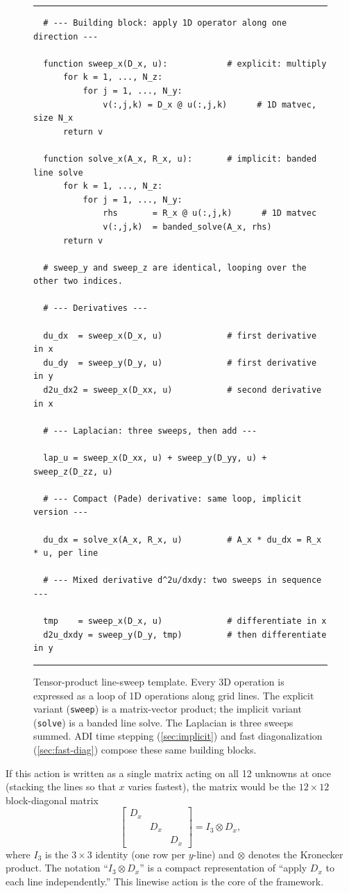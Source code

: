 \documentclass[11pt]{article}
\newcommand{\kron}{\otimes}
\newcommand{\Dx}{D_{x}}
\begin{document}
\begin{figure}[t]
\hrule\medskip
\small
\begin{verbatim}
  # --- Building block: apply 1D operator along one direction ---

  function sweep_x(D_x, u):            # explicit: multiply
      for k = 1, ..., N_z:
          for j = 1, ..., N_y:
              v(:,j,k) = D_x @ u(:,j,k)      # 1D matvec, size N_x
      return v

  function solve_x(A_x, R_x, u):       # implicit: banded line solve
      for k = 1, ..., N_z:
          for j = 1, ..., N_y:
              rhs       = R_x @ u(:,j,k)      # 1D matvec
              v(:,j,k)  = banded_solve(A_x, rhs)
      return v

  # sweep_y and sweep_z are identical, looping over the other two indices.

  # --- Derivatives ---

  du_dx  = sweep_x(D_x, u)             # first derivative in x
  du_dy  = sweep_y(D_y, u)             # first derivative in y
  d2u_dx2 = sweep_x(D_xx, u)           # second derivative in x

  # --- Laplacian: three sweeps, then add ---

  lap_u = sweep_x(D_xx, u) + sweep_y(D_yy, u) + sweep_z(D_zz, u)

  # --- Compact (Pade) derivative: same loop, implicit version ---

  du_dx = solve_x(A_x, R_x, u)         # A_x * du_dx = R_x * u, per line

  # --- Mixed derivative d^2u/dxdy: two sweeps in sequence ---

  tmp    = sweep_x(D_x, u)             # differentiate in x
  d2u_dxdy = sweep_y(D_y, tmp)         # then differentiate in y
\end{verbatim}
\medskip\hrule
\caption{Tensor-product line-sweep template.  Every 3D operation is
  expressed as a loop of 1D operations along grid lines.  The explicit
  variant
  (\texttt{sweep}) is a matrix-vector product; the implicit variant
  (\texttt{solve}) is a banded line solve.  The Laplacian is three
  sweeps summed.  ADI time stepping (\cref{sec:implicit}) and fast
  diagonalization (\cref{sec:fast-diag}) compose these same building
  blocks.}
\label{fig:pseudocode}
\end{figure}

If this action is written as a single matrix acting on all 12 unknowns
at once (stacking the lines so that $x$ varies fastest), the matrix
would be the $12 \times 12$ block-diagonal matrix
\begin{equation}
\label{eq:block-diag}
  \begin{bmatrix}
    \Dx &     &     \\
        & \Dx &     \\
        &     & \Dx
  \end{bmatrix}
  = I_3 \kron \Dx,
\end{equation}
where $I_3$ is the $3 \times 3$ identity (one row per $y$-line) and
$\kron$ denotes the Kronecker product.  The notation
``$I_3 \kron \Dx$'' is a compact representation of ``apply $\Dx$ to
each line independently.''  This linewise action is the core of the
framework.
\end{document}
